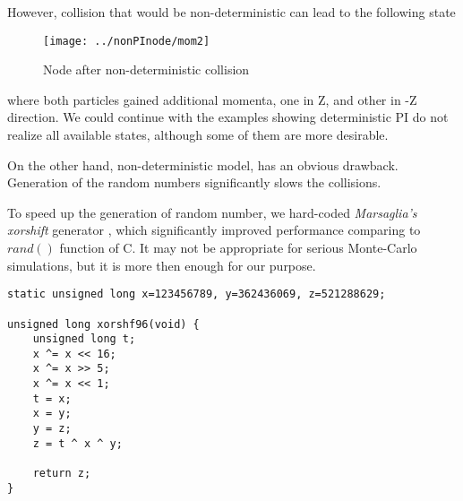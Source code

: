 However, collision that would be non-deterministic can lead to the following state
\begin{figure}[htbp]
 \centering 
 \texttt{[image: ../nonPInode/mom2]}
 \label{transitions}
 \caption{Node after non-deterministic collision}
\end{figure}

where both particles gained additional momenta, one in Z, and other in -Z direction.
We could continue with the examples showing deterministic PI do not realize all available states, although some of them are more desirable. 



\bigskip

On the other hand, non-deterministic model, has an obvious drawback. Generation of the random numbers significantly slows the collisions.

To speed up the generation of random number, we hard-coded \textit{Marsaglia's xorshift} generator \cite{mars}, which significantly improved performance comparing to $rand()$ function of C. It may not be appropriate for serious Monte-Carlo simulations, but it is more then enough for our purpose.

\begin{lstlisting}
static unsigned long x=123456789, y=362436069, z=521288629;

unsigned long xorshf96(void) {        
	unsigned long t;
	x ^= x << 16;
	x ^= x >> 5;
	x ^= x << 1;
    t = x;
	x = y;
	y = z;
	z = t ^ x ^ y;

	return z;
}
\end{lstlisting}


